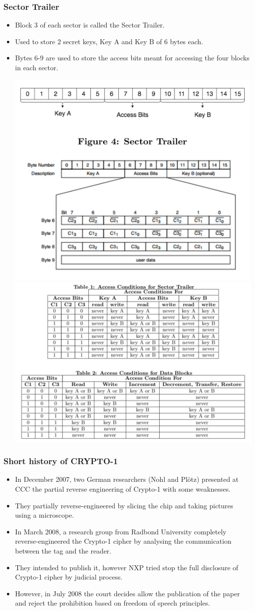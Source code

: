 \documentclass[12pt]{beamer}
\begin{document}
\begin{frame}
\frametitle{Sector Trailer}
\begin{itemize}
	\item Block 3 of each sector is called the Sector Trailer.
	\item Used to store 2 secret keys, Key A and Key B of 6 bytes each.
	\item Bytes 6-9 are used to store the access bits meant for accessing the four blocks in each sector.
	\begin{center}
		\includegraphics[width=0.45\linewidth]{sector-trailer}\includegraphics[width=0.55\linewidth]{access-condition}
	\end{center}
\end{itemize}
\end{frame}

\begin{frame}
\frametitle{Short history of CRYPTO-1}
\begin{itemize}
	\item In December 2007, two German researchers (Nohl and Pl{\"o}tz) presented at CCC the partial reverse engineering of Crypto-1 with some weaknesses.
	\item They partially reverse-engineered by slicing the chip and taking pictures using a microscope.
	\item In March 2008, a research group from Radbond University completely reverse-engineered the Crypto-1 cipher by analysing the communication between the tag and the reader.
	\item They intended to publish it, however NXP tried stop the full disclosure of Crypto-1 cipher by judicial process.
	\item However, in July 2008 the court decides allow the publication of the paper and reject the prohibition based on freedom of speech principles.
\end{itemize}
\end{frame}
\end{document}

